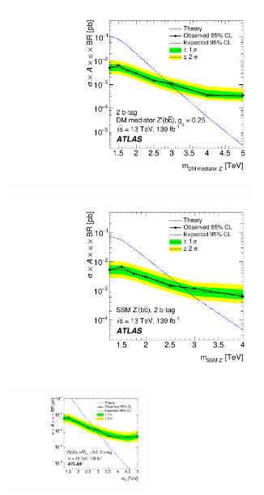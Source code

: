 \begin{figure}[!thbp]
  \begin{subfigure}{.5\textwidth}
  \centering
  \includegraphics[width=0.9\textwidth]{figs/fig_07a.pdf}
  \caption{}
  \end{subfigure}
  \begin{subfigure}{.5\textwidth}
  \centering
  \includegraphics[width=0.9\textwidth]{figs/fig_07b.pdf}
  \caption{}
  \end{subfigure}
\newline 
  \begin{subfigure}{.99\textwidth}
  \centering
  \includegraphics[width=0.5\textwidth]{figs/fig_07c.pdf}

\end{subfigure}
\end{figure}
